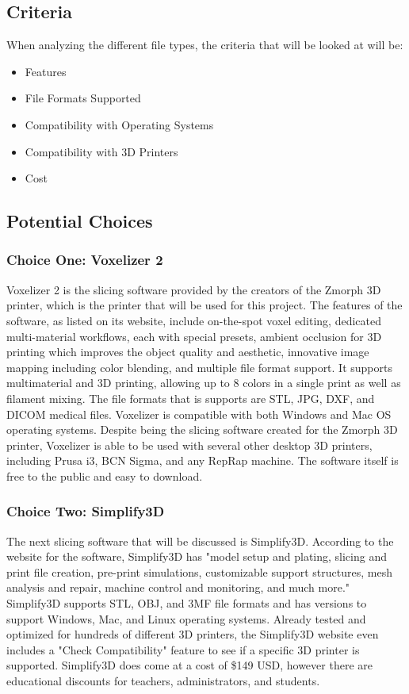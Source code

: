 \documentclass[letterpaper, onecolumn, draftclsnofoot,10pt, compsoc]{IEEEtran}
\begin{document}
\subsection{Criteria}
When analyzing the different file types, the criteria that will be looked at will be: \begin{itemize}
\item Features
\item File Formats Supported
\item Compatibility with Operating Systems
\item Compatibility with 3D Printers
\item Cost

\end{itemize}
\subsection{Potential Choices}
\subsubsection{Choice One: Voxelizer 2}
Voxelizer 2 is the slicing software provided by the creators of the Zmorph 3D printer, which is the printer that will be used for this project. 
The features of the software, as listed on its website, include on-the-spot voxel editing, dedicated multi-material workflows, each with special presets, ambient occlusion for 3D printing which improves the object quality and aesthetic, innovative image mapping including color blending, and multiple file format support. 
It supports multimaterial and 3D printing, allowing up to 8 colors in a single print as well as filament mixing.
The file formats that is supports are STL, JPG, DXF, and DICOM medical files. 
Voxelizer is compatible with both Windows and Mac OS operating systems. 
Despite being the slicing software created for the Zmorph 3D printer, Voxelizer is able to be used with several other desktop 3D printers, including Prusa i3, BCN Sigma, and any RepRap machine. 
The software itself is free to the public and easy to download. \cite{voxelweb}

\subsubsection{Choice Two: Simplify3D}
The next slicing software that will be discussed is Simplify3D.
According to the website for the software, Simplify3D has "model setup and plating, slicing and print file creation, pre-print simulations, customizable support structures, mesh analysis and repair, machine control and monitoring, and much more."
Simplify3D supports STL, OBJ, and 3MF file formats and has versions to support Windows, Mac, and Linux operating systems.
Already tested and optimized for hundreds of different 3D printers, the Simplify3D website even includes a "Check Compatibility" feature to see if a specific 3D printer is supported.
Simplify3D does come at a cost of \$149 USD, however there are educational discounts for teachers, administrators, and students. \cite{3dsweb}
\end{document}
